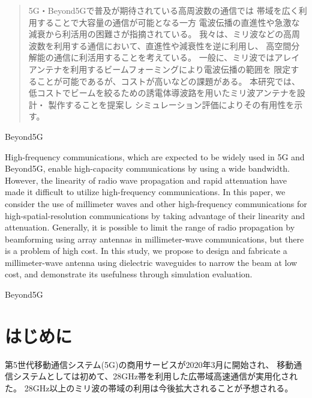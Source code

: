 \documentclass[technicalreport]{ieicej}
\begin{document}
\begin{abstract}
  5G・Beyond5Gで普及が期待されている高周波数の通信では
  帯域を広く利用することで大容量の通信が可能となる一方
  電波伝播の直進性や急激な減衰から利活用の困難さが指摘されている。
  我々は、ミリ波などの高周波数を利用する通信において、直進性や減衰性を逆に利用し、
  高空間分解能の通信に利活用することを考えている。
  一般に、ミリ波ではアレイアンテナを利用するビームフォーミングにより電波伝播の範囲を
  限定することが可能であるが、コストが高いなどの課題がある。
  本研究では、低コストでビームを絞るための誘電体導波路を用いたミリ波アンテナを設計・
  製作することを提案し
  シミュレーション評価によりその有用性を示す。
\end{abstract}
\begin{keyword}
Beyond5G
\end{keyword}
\begin{eabstract}
High-frequency communications,
which are expected to be widely used in 5G and Beyond5G,
enable high-capacity communications by using a wide bandwidth.
However, the linearity of radio wave propagation and rapid attenuation
have made it difficult to utilize high-frequency communications.
In this paper, we consider the use of millimeter waves and
other high-frequency communications for high-spatial-resolution communications
by taking advantage of their linearity and attenuation.
Generally, it is possible to limit the range of radio propagation by
beamforming using array antennas in millimeter-wave communications,
but there is a problem of high cost.
In this study,
we propose to design and fabricate a millimeter-wave antenna using
dielectric waveguides to narrow the beam at low cost,
and demonstrate its usefulness through simulation evaluation.
\end{eabstract}
\begin{ekeyword}
Beyond5G
\end{ekeyword}
\maketitle

\section{はじめに}

第5世代移動通信システム(5G)の商用サービスが2020年3月に開始され、
移動通信システムとしては初めて、28GHz帯を利用した広帯域高速通信が実用化された。
28GHz以上のミリ波の帯域の利用は今後拡大されることが予想される。
\end{document}
